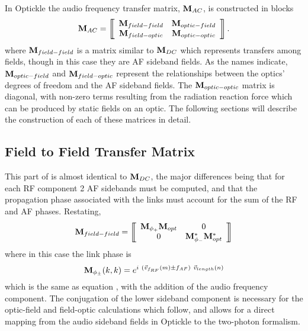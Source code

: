 \documentclass[12pt]{article}
\begin{document}
In Optickle the audio frequency transfer matrix, $\mAC$, is constructed in blocks
\begin{equation}
\mAC =
\matrixBegin{cc}
 \matm{field-field} & \matm{optic-field} \\
 \matm{field-optic} & \matm{optic-optic} \\
\matrixEnd
.
\elabel{mAC}
\end{equation}
where $\matm{field-field}$ is a matrix similar to $\mDC$ which represents transfers among fields, though in this case they are AF sideband fields.
As the names indicate, $\matm{optic-field}$ and $\matm{field-optic}$ represent the relationships between the optics' degrees of freedom and the AF sideband fields.
The $\matm{optic-optic}$ matrix is diagonal, with non-zero terms
 resulting from the radiation reaction force which can be produced
 by static fields on an optic. 
The following sections will describe the construction of each of these matrices in detail.


\subsection{Field to Field Transfer Matrix}
This part of  is almost identical to $\mDC$, the major differences being that for each RF component 2 AF sidebands must be computed, and that the propagation phase associated with the links must account for the sum of the RF and AF phases.
Restating,
\begin{equation}
\matm{field-field} =
\matrixBegin{cc}
 \mPhin{+} \mOpt & 0 \\
 0 & \mPhin{-}^* \mOpt^* \\
\matrixEnd
\end{equation}
where in this case the link phase is
\begin{equation}
\mPhin{\pm}(k,k) = e^{i ~ (\vFrf(m) \pm f_{AF}) ~ \vLen(n)}
\end{equation}
which is the same as equation , with the addition of the audio frequency component.
The conjugation of the lower sideband component is necessary for the optic-field and field-optic
 calculations which follow, and allows for a direct mapping from the audio sideband fields in Optickle
 to the two-photon formalism.

\end{document}
